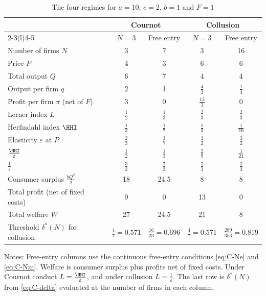 \begin{table}[htbp]
\centering
\begin{threeparttable}
\caption{The four regimes for $a = 10$, $c = 2$, $b = 1$ and $F = 1$}
\label{tab:C-cournot-numbers}
\small
\begin{tabular}{@{}lcccc@{}}
\toprule
 & \multicolumn{2}{c}{Cournot} & \multicolumn{2}{c}{Collusion} \\
\cmidrule(lr){2-3}\cmidrule(l){4-5}
 & $N = 3$ & Free entry & $N = 3$ & Free entry \\
\midrule
Number of firms $N$ & 3 & 7 & 3 & 16 \\
Price $P$ & 4 & 3 & 6 & 6 \\
Total output $Q$ & 6 & 7 & 4 & 4 \\
Output per firm $q$ & 2 & 1 & $\frac{4}{3}$ & $\frac{1}{4}$ \\
Profit per firm $\pi$ (net of $F$) & 3 & 0 & $\frac{13}{3}$ & 0 \\
Lerner index $L$ & $\frac{1}{2}$ & $\frac{1}{3}$ & $\frac{2}{3}$ & $\frac{2}{3}$ \\
Herfindahl index $\HHI$ & $\frac{1}{3}$ & $\frac{1}{7}$ & $\frac{1}{3}$ & $\frac{1}{16}$ \\
Elasticity $\varepsilon$ at $P$ & $\frac{2}{3}$ & $\frac{3}{7}$ & $\frac{3}{2}$ & $\frac{3}{2}$ \\
$\frac{\HHI}{\varepsilon}$ & $\frac{1}{2}$ & $\frac{1}{3}$ & $\frac{2}{9}$ & $\frac{1}{24}$ \\
$\frac{1}{\varepsilon}$ & $\frac{3}{2}$ & $\frac{7}{3}$ & $\frac{2}{3}$ & $\frac{2}{3}$ \\
Consumer surplus $\frac{bQ^2}{2}$ & 18 & 24.5 & 8 & 8 \\
Total profit (net of fixed costs) & 9 & 0 & 13 & 0 \\
Total welfare $W$ & 27 & 24.5 & 21 & 8 \\
Threshold $\delta^*(N)$ for collusion & $\frac{4}{7} = 0.571$ & $\frac{16}{23} = 0.696$ &
  $\frac{4}{7} = 0.571$ & $\frac{289}{353} = 0.819$ \\
\bottomrule
\end{tabular}
\begin{tablenotes}\footnotesize
\item Notes: Free-entry columns use the continuous free-entry conditions \eqref{eq:C-Ne} and \eqref{eq:C-Nm}.
Welfare is consumer surplus plus profits net of fixed costs. Under Cournot conduct $L = \frac{\HHI}{\varepsilon}$,
and under collusion $L = \frac{1}{\varepsilon}$. The last row is $\delta^*(N)$ from \eqref{eq:C-delta}
evaluated at the number of firms in each column.
\end{tablenotes}
\end{threeparttable}
\end{table}

